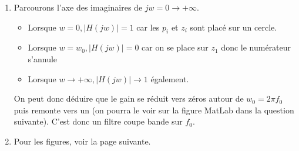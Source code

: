 \documentclass{article}
\theoremstyle{plain}%
\theoremstyle{definition}
\theoremstyle{remark}
\begin{document}
\begin{enumerate}
    \item Parcourons l'axe des imaginaires de $ jw = 0 \to +\infty  $. \begin{itemize}
        \item Lorsque $ w=0, \left| H(jw) \right| = 1$ car les $ p_i $ et $ z_i $ sont placé sur un cercle.
        \item Lorsque $ w=w_0, \left| H(jw) \right| = 0$ car on se place sur $ z_1 $ donc le numérateur s'annule  
        \item Lorsque $ w \to + \infty , \left| H(jw) \right| \to 1$ également.
    \end{itemize}
    On peut donc déduire que le gain se réduit vers zéros autour de $ w_0 = 2 \pi f_0 $ puis remonte vers un (on pourra le voir sur la figure MatLab dans la question suivante). C'est donc un filtre coupe bande sur $ f_0 $.
    
    \item Pour les figures, voir la page suivante.
\end{enumerate}
\end{document}
